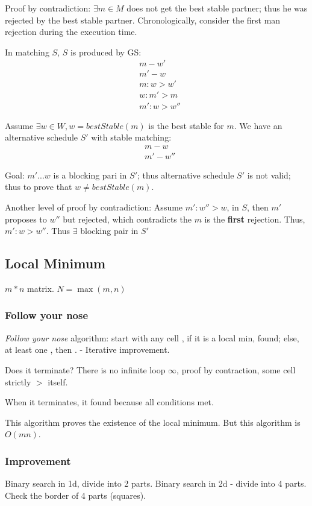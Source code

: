 \documentclass[a4paper]{report}
\theoremstyle{definition}
\begin{document}
Proof by contradiction: $\exists m\in M$ does not get the best stable partner; thus he was rejected by the best stable partner. Chronologically, consider the first man rejection during the execution time.

In matching $S$, $S$ is produced by GS:
\begin{align*}
& m-w'\\
& m'-w\\
& m: w >w'\\
& w: m' > m\\
&m': w > w''
\end{align*}

Assume $\exists w\in W, w=bestStable(m)$ is the best stable for $m$. We have an alternative schedule $S'$ with stable matching:
\begin{align*}
& m-w\\
& m'-w''
\end{align*}



Goal: $m'... w$ is a blocking pari in $S'$; thus alternative schedule $S'$ is not valid; thus to prove that $w\neq bestStable(m)$.

Another level of proof by contradiction:
Assume $m': w'' >w$, in $S$, then $m'$ proposes to $w''$ but rejected, which contradicts the $m$ is the \textbf{first} rejection. Thus, $m': w>w''$. Thus $\exists$ blocking pair in $S'$

\subsection*{Local Minimum}
$m*n$ matrix. $N=\max(m, n)$

\subsubsection*{Follow your nose}
\textit{Follow your nose} algorithm: start with any cell , if it is a local min, found; else, at least one , then . - Iterative improvement.

Does it terminate? There is no infinite loop $\infty$, proof by contraction, some cell strictly $>$ itself.

When it terminates, it found because all conditions met.

This algorithm proves the existence of the local minimum. But this algorithm is $O(mn)$.
\subsubsection*{Improvement}
Binary search in 1d, divide into 2 parts. Binary search in 2d - divide into 4 parts.
Check the border of 4 parts (squares).
\end{document}
